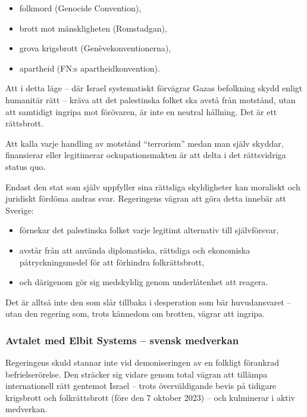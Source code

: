 \documentclass[12pt]{article}
\begin{document}
\begin{itemize}
  \item folkmord (Genocide Convention),
  \item brott mot mänskligheten (Romstadgan),
  \item grova krigsbrott (Genèvekonventionerna),
  \item apartheid (FN:s apartheidkonvention).
\end{itemize}

Att i detta läge – där Israel systematiskt förvägrar Gazas befolkning skydd enligt humanitär rätt – kräva att det palestinska folket ska avstå från motstånd, utan att samtidigt ingripa mot förövaren, är inte en neutral hållning. Det är ett rättsbrott.

Att kalla varje handling av motstånd “terrorism” medan man själv skyddar, finansierar eller legitimerar ockupationsmakten är att delta i det rättsvidriga status quo.

\medskip

Endast den stat som själv uppfyller sina rättsliga skyldigheter kan moraliskt och juridiskt fördöma andras svar. Regeringens vägran att göra detta innebär att Sverige:

\begin{itemize}
  \item förnekar det palestinska folket varje legitimt alternativ till självförsvar,
  \item avstår från att använda diplomatiska, rättsliga och ekonomiska påtryckningsmedel för att förhindra folkrättsbrott,
  \item och därigenom gör sig medskyldig genom underlåtenhet att reagera.
\end{itemize}

Det är alltså inte den som slår tillbaka i desperation som bär huvudansvaret – utan den regering som, trots kännedom om brotten, vägrar att ingripa.

\bigskip

\subsubsection*{Avtalet med Elbit Systems – svensk medverkan}

Regeringens skuld stannar inte vid demoniseringen av en folkligt förankrad befrielserörelse. Den sträcker sig vidare genom total vägran att tillämpa internationell rätt gentemot Israel – trots överväldigande bevis på tidigare krigsbrott och folkrättsbrott (före den 7 oktober 2023) – och kulminerar i aktiv medverkan.
\end{document}
